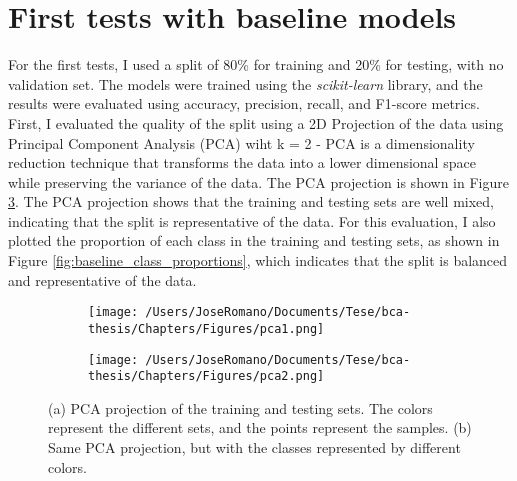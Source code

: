 
\section{First tests with baseline models}

For the first tests, I used a split of 80\% for training and 20\% for testing,
with no validation set. The models were trained using the \textit{scikit-learn}
library, and the results were evaluated using accuracy, precision, recall, and
F1-score metrics. First, I evaluated the quality of the split using a 2D
Projection of the data using Principal Component Analysis (PCA) wiht k = 2 -
PCA is a dimensionality reduction technique that transforms the data into a
lower dimensional space while preserving the variance of the data. The PCA
projection is shown in Figure \ref{fig:side_by_side_pca}. The PCA projection
shows that the training and testing sets are well mixed, indicating that the
split is representative of the data. For this evaluation, I also plotted the
proportion of each class in the training and testing sets, as shown in Figure
\ref{fig:baseline_class_proportions}, which indicates that the split is
balanced and representative of the data.

\begin{figure}[ht]
  \centering
  \begin{subfigure}[t]{0.48\textwidth}
    \centering
    \texttt{[image: /Users/JoseRomano/Documents/Tese/bca-thesis/Chapters/Figures/pca1.png]}
    \caption{}
    \label{fig:baseline_pca_projection1}
  \end{subfigure}
  \hfill
  \begin{subfigure}[t]{0.48\textwidth}
    \centering
    \texttt{[image: /Users/JoseRomano/Documents/Tese/bca-thesis/Chapters/Figures/pca2.png]} %
    \caption{}
    \label{fig:baseline_pca_projection2}
  \end{subfigure}
  \caption{(a) PCA projection of the training and testing sets. The colors represent the different sets, and the points represent the samples. (b) Same PCA projection, but with the classes represented by different colors.}
  \label{fig:side_by_side_pca}
\end{figure}


